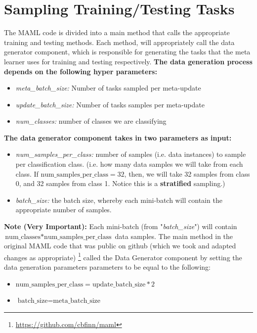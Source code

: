 \documentclass{article}
\begin{document}
\section{Sampling Training/Testing Tasks}
The MAML code is divided into a main method that calls the appropriate training and testing methods. Each method, will appropriately call the data generator component, which is responsible for generating the tasks that the meta learner uses for training and testing respectively. \textbf{The data generation process depends on the following hyper parameters:}
\begin{itemize}
\item \textit{meta\_batch\_size:} Number of tasks sampled per meta-update
\item \textit{update\_batch\_size:} Number of tasks samples per meta-update
\item \textit{num\_classes:} number of classes we are classifying
\end{itemize}

\noindent\textbf{The data generator component takes in two parameters as input:}
\begin{itemize}
\item \textit{num\_samples\_per\_class:} number of samples (i.e. data instances) to sample per classification class. (i.e. how many data samples we will take from each class. If $\text{num\_samples\_per\_class}= 32$, then, we will take 32 samples from class 0, and 32 samples from class 1. Notice this is a \textbf{stratified} sampling.)
\item \textit{batch\_size:} the batch size, whereby each mini-batch will contain the appropriate number of samples. 
\end{itemize}

\noindent\textbf{Note (Very Important):} Each mini-batch (from "\textit{batch\_size}") will contain  $  \text{num\_classes} * \text{num\_samples\_per\_class}$ data samples. The main method in the original MAML code that was public on github (which we took and adapted changes as appropriate) \footnote{\url{https://github.com/cbfinn/maml}} called the Data Generator component by setting the data generation parameters parameters to be equal to the following:
\begin{itemize}
\item $\text{num\_samples\_per\_class} = \text{update\_batch\_size} * 2$
\item $\text{batch\_size} = \text{meta\_batch\_size}$
\end{itemize}
\end{document}
